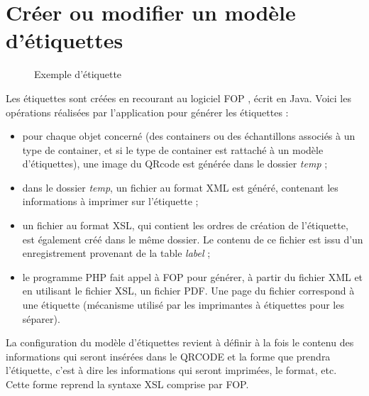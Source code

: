 \section{Créer ou modifier un modèle d'étiquettes}

\begin{figure}[H]
\centering
{}
\caption{Exemple d'étiquette}
\end{figure}

Les étiquettes sont créées en recourant au logiciel FOP \cite{fop}, écrit en Java. Voici les opérations réalisées par l'application pour générer les étiquettes :
\begin{itemize}
\item pour chaque objet concerné (des containers ou des échantillons associés à un type de container, et si le type de container est rattaché à un modèle d'étiquettes), une image du QRcode est générée dans le dossier \textit{temp} ;
\item dans le dossier \textit{temp}, un fichier au format XML est généré, contenant les informations à imprimer sur l'étiquette ;
\item un fichier au format XSL, qui contient les ordres de création de l'étiquette, est également créé dans le même dossier. Le contenu de ce fichier est issu d'un enregistrement provenant de la table \textit{label} ;
\item le programme PHP fait appel à FOP pour générer, à partir du fichier XML et en utilisant le fichier XSL, un fichier PDF. Une page du fichier correspond à une étiquette (mécanisme utilisé par les imprimantes à étiquettes pour les séparer).
\end{itemize}

La configuration du modèle d'étiquettes revient à définir à la fois le contenu des informations qui seront insérées dans le QRCODE et la forme que prendra l'étiquette, c'est à dire les informations qui seront imprimées, le format, etc. Cette forme reprend la syntaxe XSL comprise par FOP.

